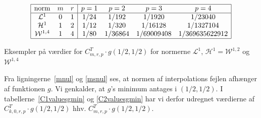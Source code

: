\begin{table}[htb]
\begin{displaymath}
\begin{array}{|ccc|cccc|}
  \hline {\rm norm} & m & r & p=1 & p=2 & p=3 & p=4 \\
  \hline {\mathcal L}^1 & 0 & 1 & 1/24 & 1/192 & 1/1920 & 1/23040 \\
         {\mathcal H}^1 & 1 & 2 & 1/12 & 1/320 & 1/16128 & 1/1327104 \\
         {\mathcal W}^{1,4} & 1 & 4 & 1/80 & 1/36864 &
         1/69009408 & 1/369635622912 \\ \hline
\end{array}
\end{displaymath}
\caption{Eksempler på værdier for $C_{m,r,p}^T\cdot g(1/2,1/2)$ for normerne
${\mathcal L}^1$, ${\mathcal H}^1 = {\mathcal W}^{1,2}$ og
${\mathcal W}^{1,4}$\label{C2valuesgmin}}
\end{table}
\begin{remark}
Fra ligningerne~\ref{mnul} og \ref{msnul} ses, at normen af
interpolations fejlen afhænger af funktionen $g$. Vi genkalder, at
$g$'s minimum antages i $(1/2,1/2)$. I tabellerne~\ref{C1valuesgmin}
og \ref{C2valuesgmin} har vi derfor udregnet værdierne af
$C^T_{k,0,r,p}\cdot g(1/2,1/2)$ hhv.
$C_{m,r,p}^T\cdot g(1/2,1/2)$.
\end{remark}

